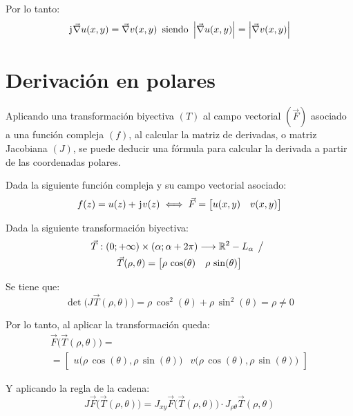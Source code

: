 Por lo tanto:
\begin{equation*}
    \mkern2mu\mathrm{j}\mkern1mu \Vec{\nabla} u(x,y) = \Vec{\nabla} v(x,y) \enspace \textrm{siendo} \enspace {\left| {\Vec{\nabla}u(x,y)} \right|} = {\left| {\Vec{\nabla} v(x,y)} \right|}
\end{equation*}


\section{Derivación en polares}

Aplicando una transformación biyectiva $(T)$ al campo vectorial $(\Vec{F})$ asociado a una función compleja $(f)$, al calcular la matriz de derivadas, o matriz Jacobiana $(J)$, se puede deducir una fórmula para calcular la derivada a partir de las coordenadas polares.

Dada la siguiente función compleja y su campo vectorial asociado:
\begin{equation*}
    f(z) = u(z) + \mkern2mu\mathrm{j}\mkern1mu v(z) \iff \Vec{F} = \begin{bmatrix} u(x,y) & v(x,y) \end{bmatrix}
\end{equation*}

Dada la siguiente transformación biyectiva:
\begin{multline*}
    \Vec{T}: (0;+\infty) \times (\alpha;\alpha+2\pi) \longrightarrow \mathbb{R}^2 - L_\alpha \hspace{1ex} \big/ \hspace{1ex}
    \\
    \Vec{T}(\rho,\theta) = \begin{bmatrix} \rho \, \cos(\theta) & \rho \, \sin(\theta) \end{bmatrix}
\end{multline*}

Se tiene que:
\begin{equation*}
    \operatorname{det} \big( J \Vec{T}(\rho,\theta) \big) = \rho \, \cos^2(\theta) + \rho \, \sin^2(\theta) = \rho \neq 0
\end{equation*}

Por lo tanto, al aplicar la transformación queda:
\begin{multline*}
    \Vec{F} \Big( \Vec{T}(\rho,\theta) \Big) =
    \\
    = \begin{bmatrix} u \Big( \rho \, \cos{(\theta)} , \rho \, \sin(\theta) \Big) & v \Big( \rho \, \cos(\theta) , \rho \, \sin(\theta) \Big) \end{bmatrix}
\end{multline*}

Y aplicando la regla de la cadena:
\begin{equation*}
    J \Vec{F} \Big( \Vec{T}(\rho,\theta) \Big) = J_{xy} \Vec{F} \Big( \Vec{T}(\rho,\theta) \Big) \cdot J_{\rho\theta} \Vec{T}(\rho,\theta)
\end{equation*}

